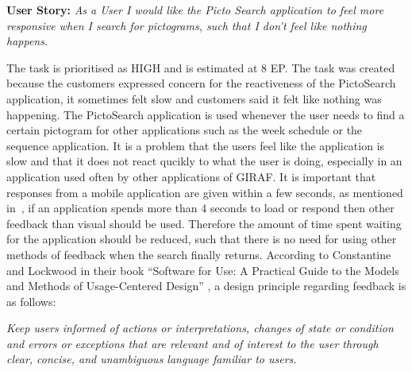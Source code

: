 \textbf{User Story:} \textit{As a User I would like the Picto Search application to feel more responsive when I search for pictograms, such that I don't feel like nothing happens.} \newline

The task is prioritised as HIGH and is estimated at 8 EP.
The task was created because the customers expressed concern for the reactiveness of the PictoSearch application, it sometimes felt slow and customers said it felt like nothing was happening.
The PictoSearch application is used whenever the user needs to find a certain pictogram for other applications such as the week schedule or the sequence application.
It is a problem that the users feel like the application is slow and that it does not react qucikly to what the user is doing, especially in an application used often by other applications of GIRAF.
It is important that responses from a mobile application are given within a few seconds, as mentioned in~\cite{Roto:2005:NNF:1062745.1062747}, if an application spends more than 4 seconds to load or respond then other feedback than visual should be used.
Therefore the amount of time spent waiting for the application should be reduced, such that there is no need for using other methods of feedback when the search finally returns.
According to Constantine and Lockwood in their book ``Software for Use: A Practical Guide to the Models and Methods of Usage-Centered Design'' \cite{DESIGNBOOK}, a design principle regarding feedback is as follows:

\begin{displayquote}
\textit{Keep users informed of actions or interpretations, changes of state or condition and errors or exceptions that are relevant and of interest to the user through clear, concise, and unambiguous language familiar to users\cite[p.~57]{DESIGNBOOK}.}
\end{displayquote}

